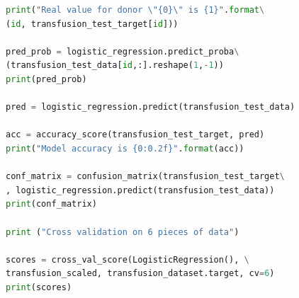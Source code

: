 \documentclass[11pt, a4paper, notitlepage]{report}
\begin{document}
\begin{appendices}
\begin{lstlisting}[language=Python]
print("Real value for donor \"{0}\" is {1}".format\
(id, transfusion_test_target[id]))

pred_prob = logistic_regression.predict_proba\
(transfusion_test_data[id,:].reshape(1,-1))
print(pred_prob)

pred = logistic_regression.predict(transfusion_test_data)

acc = accuracy_score(transfusion_test_target, pred)
print("Model accuracy is {0:0.2f}".format(acc))

conf_matrix = confusion_matrix(transfusion_test_target\
, logistic_regression.predict(transfusion_test_data))
print(conf_matrix)

print ("Cross validation on 6 pieces of data")

scores = cross_val_score(LogisticRegression(), \
transfusion_scaled, transfusion_dataset.target, cv=6)
print(scores)
\end{lstlisting}
\end{appendices}
\end{document}
